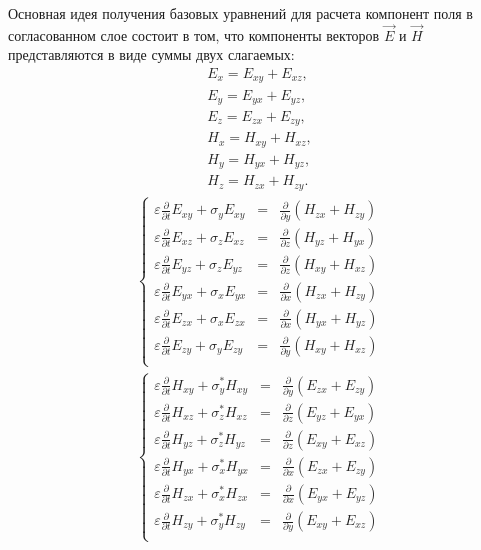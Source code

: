 Основная идея получения базовых уравнений для расчета компонент поля
в согласованном слое состоит в том, что компоненты векторов $\vec{E}$
и $\vec{H}$ представляются в виде суммы двух слагаемых:
\begin{align*}
    E_x = E_{xy}+E_{xz}, \\
    E_y = E_{yx}+E_{yz}, \\
    E_z = E_{zx}+E_{zy}, \\
    H_x = H_{xy}+H_{xz}, \\
    H_y = H_{yx}+H_{yz}, \\
    H_z = H_{zx}+H_{zy}.
\end{align*}
\begin{eqnarray}
\label{eq:pml13}
\left\{
\begin{array}{rcl}
  \varepsilon \frac{\partial}{\partial t}E_{xy} + \sigma_y E_{xy} & = & \frac{\partial}{\partial y}(H_{zx}+H_{zy}) \\
  \varepsilon \frac{\partial}{\partial t}E_{xz} + \sigma_z E_{xz} & = & \frac{\partial}{\partial z}(H_{yz}+H_{yx}) \\
  \varepsilon \frac{\partial}{\partial t}E_{yz} + \sigma_z E_{yz} & = & \frac{\partial}{\partial z}(H_{xy}+H_{xz}) \\
  \varepsilon \frac{\partial}{\partial t}E_{yx} + \sigma_x E_{yx} & = & \frac{\partial}{\partial x}(H_{zx}+H_{zy}) \\
  \varepsilon \frac{\partial}{\partial t}E_{zx} + \sigma_x E_{zx} & = & \frac{\partial}{\partial x}(H_{yx}+H_{yz}) \\
  \varepsilon \frac{\partial}{\partial t}E_{zy} + \sigma_y E_{zy} & = & \frac{\partial}{\partial y}(H_{xy}+H_{xz}) \\
\end{array}
\right.
\end{eqnarray}
\begin{eqnarray}
\label{eq:pml14}
\left\{
\begin{array}{rcl}
  \varepsilon \frac{\partial}{\partial t}H_{xy} + \sigma_y^* H_{xy} & = & \frac{\partial}{\partial y}(E_{zx}+E_{zy}) \\
  \varepsilon \frac{\partial}{\partial t}H_{xz} + \sigma_z^* H_{xz} & = & \frac{\partial}{\partial z}(E_{yz}+E_{yx}) \\
  \varepsilon \frac{\partial}{\partial t}H_{yz} + \sigma_z^* H_{yz} & = & \frac{\partial}{\partial z}(E_{xy}+E_{xz}) \\
  \varepsilon \frac{\partial}{\partial t}H_{yx} + \sigma_x^* H_{yx} & = & \frac{\partial}{\partial x}(E_{zx}+E_{zy}) \\
  \varepsilon \frac{\partial}{\partial t}H_{zx} + \sigma_x^* H_{zx} & = & \frac{\partial}{\partial x}(E_{yx}+E_{yz}) \\
  \varepsilon \frac{\partial}{\partial t}H_{zy} + \sigma_y^* H_{zy} & = & \frac{\partial}{\partial y}(E_{xy}+E_{xz}) \\
\end{array}
\right.
\end{eqnarray}

